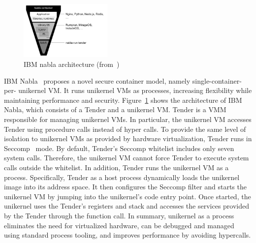  
\begin{figure}[htp]
    \centering
    \includegraphics[width=0.4\textwidth]{images/nabla.png}
    \caption[IBM nabla architecture]{IBM nabla architecture (from~\cite*{Nabla})}
    \label{fig:nabla}
\end{figure}

IBM Nabla~\cite*{10.1145/3267809.3267845} proposes a novel secure container model, namely single-container- per- unikernel VM. It runs unikernel VMs as processes, increasing flexibility while maintaining performance and security. Figure~\ref{fig:nabla} shows the architecture of IBM Nabla, which consists of a Tender and a unikernel VM. Tender is a \acrshort{VMM} 
responsible for managing unikernel VMs. In particular, the unikernel VM accesses Tender using procedure calls instead of hyper calls. To provide the same level of isolation to unikernel VMs as provided by hardware virtualization, Tender runs in Seccomp~\cite*{seccomp} mode. By default, Tender's Seccomp whitelist includes only seven system calls. Therefore, the unikernel VM cannot 
force Tender to execute system calls outside the whitelist. In addition, Tender runs the unikernel VM as a process. Specifically, Tender as a host process dynamically loads the unikernel image into its address space. It then configures the Seccomp filter and starts the unikernel VM by jumping into the unikernel's code entry point. Once started, the unikernel uses 
the Tender's registers and stack and accesses the services provided by the Tender through the function call. In summary, unikernel as a process eliminates the need for virtualized hardware, can be debugged and managed using standard process tooling, and improves performance by avoiding hypercalls.


